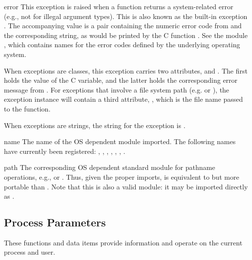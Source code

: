 \begin{excdesc}{error}
This exception is raised when a function returns a
system-related error (e.g., not for illegal argument types).  This is
also known as the built-in exception .  The
accompanying value is a pair containing the numeric error code from
 and the corresponding string, as would be printed by the
C function .  See the module
, which contains names for the
error codes defined by the underlying operating system.

When exceptions are classes, this exception carries two attributes,
 and .  The first holds the value of
the C  variable, and the latter holds the corresponding
error message from .  For exceptions that
involve a file system path (e.g.  or
), the exception instance will contain a third
attribute, , which is the file name passed to the
function.

When exceptions are strings, the string for the exception is
.
\end{excdesc}

\begin{datadesc}{name}
The name of the OS dependent module imported.  The following names
have currently been registered: , ,
, , , , .
\end{datadesc}

\begin{datadesc}{path}
The corresponding OS dependent standard module for pathname
operations, e.g.,  or .  Thus, given
the proper imports,  is equivalent to but
more portable than .  Note that this 
is also a valid module: it may be imported directly as
.
\end{datadesc}



\subsection{Process Parameters \label{os-procinfo}}

These functions and data items provide information and operate on the
current process and user.

